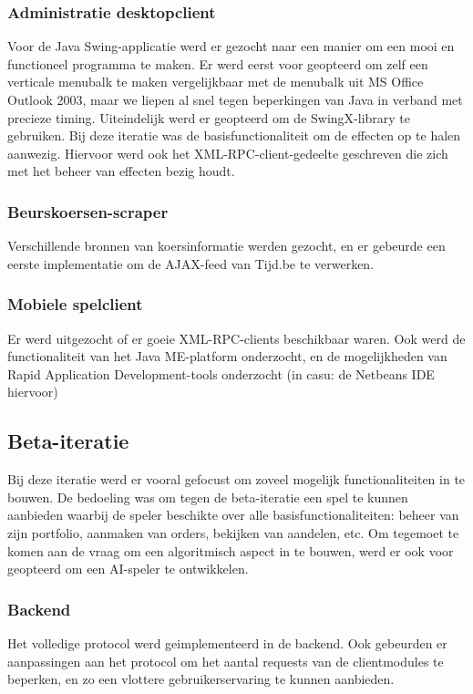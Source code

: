 \subsubsection{Administratie desktopclient}
Voor de Java Swing-applicatie werd er gezocht naar een manier om een mooi en functioneel programma te maken. Er werd eerst voor geopteerd om zelf een verticale menubalk te maken vergelijkbaar met de menubalk uit MS Office Outlook 2003, maar we liepen al snel tegen beperkingen van Java in verband met precieze timing. Uiteindelijk werd er geopteerd om de SwingX-library te gebruiken.
Bij deze iteratie was de basisfunctionaliteit om de effecten op te halen aanwezig. Hiervoor werd ook het XML-RPC-client-gedeelte geschreven die zich met het beheer van effecten bezig houdt.

\subsubsection{Beurskoersen-scraper}
Verschillende bronnen van koersinformatie werden gezocht, en er gebeurde een eerste implementatie om de AJAX-feed van Tijd.be te verwerken.

\subsubsection{Mobiele spelclient}
Er werd uitgezocht of er goeie XML-RPC-clients beschikbaar waren. Ook werd de functionaliteit van het Java ME-platform onderzocht, en de mogelijkheden van Rapid Application Development-tools onderzocht (in casu: de Netbeans IDE hiervoor)


\subsection{Beta-iteratie}
Bij deze iteratie werd er vooral gefocust om zoveel mogelijk functionaliteiten in te bouwen. De bedoeling was om tegen de beta-iteratie een spel te kunnen aanbieden waarbij de speler beschikte over alle basisfunctionaliteiten: beheer van zijn portfolio, aanmaken van orders, bekijken van aandelen, etc.
Om tegemoet te komen aan de vraag om een algoritmisch aspect in te bouwen, werd er ook voor geopteerd om een AI-speler te ontwikkelen.

\subsubsection{Backend}
Het volledige protocol werd geimplementeerd in de backend. Ook gebeurden er aanpassingen aan het protocol om het aantal requests van de clientmodules te beperken, en zo een vlottere gebruikerservaring te kunnen aanbieden.

